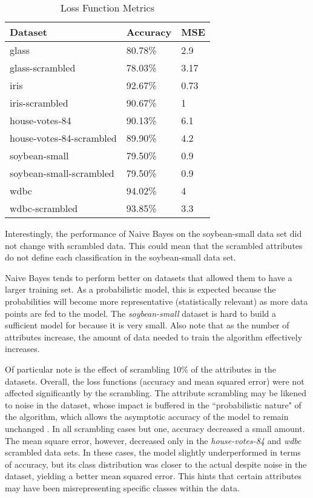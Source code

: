 \documentclass[twoside,11pt]{article}
\begin{document}
\begin{table}[h]
	\centering
	\caption{Loss Function Metrics} \label{tab:metrics}
	\begin{tabular}{|l|l|l|}
		\hline
		Dataset                  & Accuracy & MSE  \\ \hline
		glass                    & 80.78\%  & 2.9  \\ \hline
		glass-scrambled          & 78.03\%  & 3.17 \\ \hline
		iris                     & 92.67\%  & 0.73 \\ \hline
		iris-scrambled           & 90.67\%  & 1    \\ \hline
		house-votes-84           & 90.13\%  & 6.1  \\ \hline
		house-votes-84-scrambled & 89.90\%  & 4.2  \\ \hline
		soybean-small            & 79.50\%  & 0.9  \\ \hline
		soybean-small-scrambled  & 79.50\%  & 0.9  \\ \hline
		wdbc                     & 94.02\%  & 4    \\ \hline
		wdbc-scrambled           & 93.85\%  & 3.3  \\ \hline
	\end{tabular}
\end{table}

Interestingly, the performance of Naive Bayes on the soybean-small data set did not change with scrambled data. This could mean that the scrambled attributes do not define each classification in the soybean-small data set.

Naive Bayes tends to perform better on datasets that allowed them to have a larger training set. As a probabilistic model, this is expected because the probabilities will become more representative (statistically relevant) as more data points are fed to the model. The \emph{soybean-small} dataset is hard to build a sufficient model for because it is very small. Also note that as the number of attributes increase, the amount of data needed to train the algorithm effectively increases.

Of particular note is the effect of scrambling 10\% of the attributes in the datasets. Overall, the loss functions (accuracy and mean squared error) were not affected significantly by the scrambling. The attribute scrambling may be likened to noise in the dataset, whose impact is buffered in the ``probabilistic nature" of the algorithm, which allows the asymptotic accuracy of the model to remain unchanged \citep{nbPaper}. In all scrambling cases but one, accuracy decreased a small amount. The mean square error, however, decreased only in the \emph{house-votes-84} and \emph{wdbc} scrambled data sets. In these cases, the model slightly underperformed in terms of accuracy, but its class distribution was closer to the actual despite noise in the dataset, yielding a better mean squared error. This hints that certain attributes may have been misrepresenting specific classes within the data.
\end{document}
